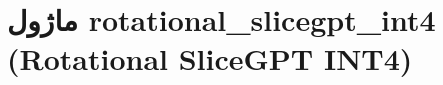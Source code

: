 \section{ماژول rotational\_slicegpt\_int4 (Rotational SliceGPT INT4)}
\label{sec:module_rotational_slicegpt_int4}
